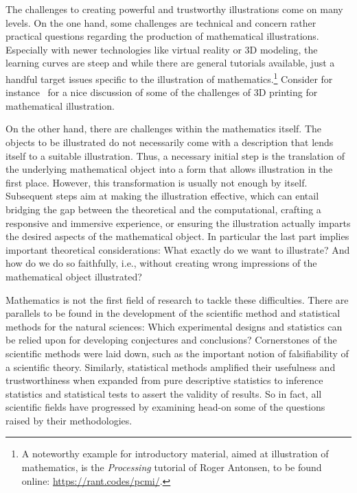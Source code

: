 \documentclass{notices}
\begin{document}
The challenges to creating powerful and trustworthy illustrations come on many levels. 
On the one hand, some challenges are technical and concern rather practical questions regarding the production of mathematical illustrations. 
Especially with newer technologies like virtual reality or 3D modeling, the learning curves are steep and while there are general tutorials available, just a handful target issues specific to the illustration of mathematics.\footnote{A noteworthy example for introductory material, aimed at illustration of mathematics, is the \emph{Processing} tutorial of Roger Antonsen, to be found online: \url{https://rant.codes/pcmi/}.}
Consider for instance~\cite{Taalman} for a nice discussion of some of the challenges of 3D printing for mathematical illustration.

On the other hand, there are challenges within the mathematics itself.
The objects to be illustrated do not necessarily come with a description that lends itself to a suitable illustration.
Thus, a necessary initial step is the translation of the underlying mathematical object into a form that allows illustration in the first place.
However, this transformation is usually not enough by itself.
Subsequent steps aim at making the illustration effective, which can entail bridging the gap between the theoretical and the computational, 
crafting a responsive and immersive experience, or ensuring the illustration actually imparts the desired aspects of the mathematical object.
In particular the last part implies important theoretical considerations: What exactly do we want to illustrate? 
And how do we do so faithfully, i.e., without creating wrong impressions of the mathematical object illustrated?

Mathematics is not the first field of research to tackle these difficulties.  
There are parallels to be found in the development of the scientific method and statistical methods for the natural sciences: Which experimental designs and statistics can be relied upon for developing conjectures and conclusions?
Cornerstones of the scientific methods were laid down, such as the important notion of falsifiability of a scientific theory.
Similarly, statistical methods amplified their usefulness and trustworthiness when expanded from pure descriptive statistics to inference statistics and statistical tests to assert the validity of results. 
So in fact, all scientific fields have progressed by examining head-on some of the questions raised by their methodologies.
\end{document}
